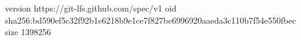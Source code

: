 version https://git-lfs.github.com/spec/v1
oid sha256:bd590ef5c32f92b1e6218b9e1ce7f827be6996920aaeda3c110b7f54e550fbec
size 1398256
